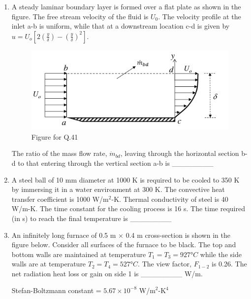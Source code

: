 \documentclass[journal,11pt,onecolumn]{IEEEtran}
\begin{document}
\begin{enumerate}[resume]
    \item A steady laminar boundary layer is formed over a flat plate as shown in the figure. The free stream velocity of the fluid is $U_0$. The velocity profile at the inlet a-b is uniform, while that at a downstream location c-d is given by $u = U_o \left[ 2(\frac{y}{\delta}) - (\frac{y}{\delta})^2 \right] $.

          \begin{figure}[H]
              \centering
              \includegraphics[scale=0.25]{q41}
              \caption{Figure for Q.41}
              \label{q41}
          \end{figure}

          The ratio of the mass flow rate, $\dot{m}_{bd}$, leaving through the horizontal section b-d to that entering through the vertical section a-b is \_\_\_\_\_\_\_\_

    \item A steel ball of 10 mm diameter at 1000 K is required to be cooled to 350 K by immersing it in a water environment at 300 K. The convective heat transfer coefficient is 1000 W/m$^2$-K. Thermal conductivity of steel is 40 W/m-K. The time constant for the cooling process is 16 s. The time required (in s) to reach the final temperature is \_\_\_\_\_\_\_\_

    \item An infinitely long furnace of 0.5 m × 0.4 m cross-section is shown in the figure below. Consider all surfaces of the furnace to be black. The top and bottom walls are maintained at temperature $T_1 = T_3 = 927°C$ while the side walls are at temperature $T_2 = T_4 = 527°C$. The view factor, $F_{1-2}$ is 0.26. The net radiation heat loss or gain on side 1 is \_\_\_\_\_\_\_\_ W/m.

          Stefan-Boltzmann constant = $5.67 \times 10^{-8}$ W/m$^2$-K$^4$


\end{enumerate}
\end{document}

